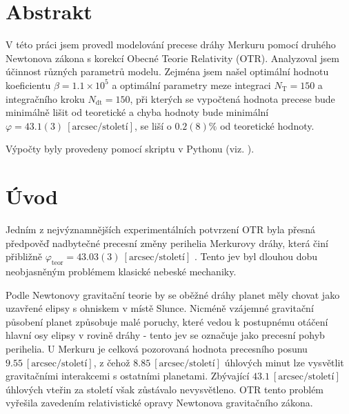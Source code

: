 \documentclass[a4paper,11pt,twocolumn]{article}
\begin{document}

    \vskip10pt

    \section{Abstrakt}
        V této práci jsem provedl modelování precese dráhy Merkuru pomocí druhého Newtonova zákona s korekcí Obecné Teorie Relativity (OTR). Analyzoval jsem účinnost různých parametrů modelu. Zejména jsem našel optimální hodnotu koeficientu $\beta = 1.1 \times 10^5$ a optimální parametry meze integraci $N_{\text{T}} = 150$ a integračního kroku $N_{\text{dt}} = 150$, při kterých se vypočtená hodnota precese bude minimálně lišit od teoretické a chyba hodnoty bude minimální $\varphi = 43.1(3) ~[\text{arcsec/století}]$, se liší o $0.2(8)\%$ od teoretické hodnoty. 
        
        Výpočty byly provedeny pomocí skriptu v Pythonu (viz. \citet{github}).

    \section{Úvod}
        Jedním z nejvýznamnějších experimentálních potvrzení OTR byla přesná předpověď nadbytečné precesní změny perihelia Merkurovy dráhy, která činí přibližně $\varphi_{\text{teor}} = 43.03(3) ~[\text{arcsec/století}]$ \citet{clemence1947}. Tento jev byl dlouhou dobu neobjasněným problémem klasické nebeské mechaniky.

        Podle Newtonovy gravitační teorie by se oběžné dráhy planet měly chovat jako uzavřené elipsy s ohniskem v místě Slunce. Nicméně vzájemné gravitační působení planet způsobuje malé poruchy, které vedou k postupnému otáčení hlavní osy elipsy v rovině dráhy - tento jev se označuje jako precesní pohyb perihelia. U Merkuru je celková pozorovaná hodnota precesního posunu $9.55 ~[\text{arcsec/století}]$, z čehož $8.85 ~[\text{arcsec/století}]$ úhlových minut lze vysvětlit gravitačními interakcemi s ostatními planetami. Zbývající $43.1 ~[\text{arcsec/století}]$ úhlových vteřin za století však zůstávalo nevysvětleno. OTR tento problém vyřešila zavedením relativistické opravy Newtonova gravitačního zákona.    
    
\end{document}

